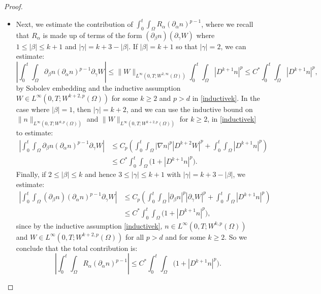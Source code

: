 \documentclass[12pt]{article}
\theoremstyle{plain}
\begin{document}
\begin{proof}
\begin{itemize}
\item Next, we estimate the contribution of $\displaystyle \int_{0}^{t} \int_{\Omega} R_{\alpha} (\partial_{\alpha}n)^{p - 1}$, where we recall that $R_{\alpha}$ is made up of terms of the form $(\partial_{\beta} n)(\partial_{\gamma} W)$ where $1 \le |\beta| \le k + 1$ and $|\gamma| = k + 3 - |\beta|$. If $|\beta| = k + 1$ so that $|\gamma| = 2$, we can estimate:
\begin{equation*}
\left|\int_{0}^{t} \int_{\Omega} \partial_{\beta} n (\partial_{\alpha}n)^{p - 1} \partial_{\gamma} W\right| \le \|W\|_{L^{\infty}(0, T; W^{2, \infty}(\Omega))} \int_{0}^{t} \int_{\Omega} |D^{k + 1}n|^{p} \le C^{*} \int_{0}^{t} \int_{\Omega} |D^{k + 1}n|^{p},
\end{equation*}
by Sobolev embedding and the inductive assumption $W \in L^{\infty}(0, T; W^{k + 2, p}(\Omega))$ for some $k \ge 2$ and $p > d$ in \eqref{inductivek}. In the case where $|\beta| = 1$, then $|\gamma| = k + 2$, and we can use the inductive bound on $\|n\|_{L^{\infty}(0, T; W^{k, p}(\Omega))}$ and $\|W\|_{L^{\infty}(0, T; W^{k + 2, p}(\Omega))}$ for $k \ge 2$, in \eqref{inductivek} to estimate:
\begin{align*}
\left|\int_{0}^{t} \int_{\Omega} \partial_{\beta} n (\partial_{\alpha} n)^{p - 1}\partial_{\gamma} W\right| &\le C_{p}\left(\int_{0}^{t} \int_{\Omega} |\nabla n|^{p} |D^{k + 2}W|^{p} + \int_{0}^{t} \int_{\Omega} |D^{k + 1}n|^{p}\right) \\
&\le C^{*} \int_{0}^{t} \int_{\Omega} \Big(1 + |D^{k + 1}n|^{p}\Big). 
\end{align*}
Finally, if $2 \le |\beta| \le k$ and hence $3 \le |\gamma| \le k + 1$ with $|\gamma| = k + 3 - |\beta|$, we estimate:
\begin{align*}
\left|\int_{0}^{t} \int_{\Omega} (\partial_{\beta} n)(\partial_{\alpha}n)^{p - 1} \partial_{\gamma} W\right| &\le C_p\left(\int_{0}^{t} \int_{\Omega} |\partial_{\beta}n|^{p} |\partial_{\gamma} W|^{p} + \int_{0}^{t} \int_{\Omega} |D^{k + 1}n|^{p}\right) \\
&\le C^{*}\int_{0}^{t} \int_{\Omega} \Big(1 + |D^{k + 1}n|^{p}\Big),
\end{align*}
since by the inductive assumption \eqref{inductivek}, $n \in L^{\infty}(0, T; W^{k, p}(\Omega))$ and $W \in L^{\infty}(0, T; W^{k + 2, p}(\Omega))$ for all $p > d$ and for some $k \ge 2$. So we conclude that the total contribution is:
\begin{equation*}
\left|\int_{0}^{t} \int_{\Omega} R_{\alpha} (\partial_{\alpha} n)^{p - 1}\right| \le C^{*} \int_{0}^{t} \int_{\Omega} \Big(1 + |D^{k + 1}n|^{p}\Big).

\end{equation*}
\end{itemize}
\end{proof}
\end{document}
